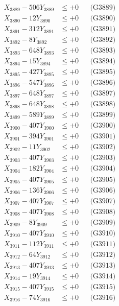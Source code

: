 \documentclass[a4paper,10pt]{article}
\begin{document}
{\begin{align}
X_{3889} - 506Y_{3889} &\leq +0 && \text{(G3889)} \\
X_{3890} - 12Y_{3890} &\leq +0 && \text{(G3890)} \\
\allowbreak
X_{3891} - 312Y_{3891} &\leq +0 && \text{(G3891)} \\
X_{3892} - 8Y_{3892} &\leq +0 && \text{(G3892)} \\
X_{3893} - 648Y_{3893} &\leq +0 && \text{(G3893)} \\
X_{3894} - 15Y_{3894} &\leq +0 && \text{(G3894)} \\
X_{3895} - 427Y_{3895} &\leq +0 && \text{(G3895)} \\
X_{3896} - 547Y_{3896} &\leq +0 && \text{(G3896)} \\
X_{3897} - 648Y_{3897} &\leq +0 && \text{(G3897)} \\
X_{3898} - 648Y_{3898} &\leq +0 && \text{(G3898)} \\
X_{3899} - 589Y_{3899} &\leq +0 && \text{(G3899)} \\
X_{3900} - 407Y_{3900} &\leq +0 && \text{(G3900)} \\
\allowbreak
X_{3901} - 394Y_{3901} &\leq +0 && \text{(G3901)} \\
X_{3902} - 11Y_{3902} &\leq +0 && \text{(G3902)} \\
X_{3903} - 407Y_{3903} &\leq +0 && \text{(G3903)} \\
X_{3904} - 182Y_{3904} &\leq +0 && \text{(G3904)} \\
X_{3905} - 407Y_{3905} &\leq +0 && \text{(G3905)} \\
X_{3906} - 136Y_{3906} &\leq +0 && \text{(G3906)} \\
X_{3907} - 407Y_{3907} &\leq +0 && \text{(G3907)} \\
X_{3908} - 407Y_{3908} &\leq +0 && \text{(G3908)} \\
X_{3909} - 8Y_{3909} &\leq +0 && \text{(G3909)} \\
X_{3910} - 407Y_{3910} &\leq +0 && \text{(G3910)} \\
\allowbreak
X_{3911} - 112Y_{3911} &\leq +0 && \text{(G3911)} \\
X_{3912} - 64Y_{3912} &\leq +0 && \text{(G3912)} \\
X_{3913} - 407Y_{3913} &\leq +0 && \text{(G3913)} \\
X_{3914} - 19Y_{3914} &\leq +0 && \text{(G3914)} \\
X_{3915} - 407Y_{3915} &\leq +0 && \text{(G3915)} \\
X_{3916} - 74Y_{3916} &\leq +0 && \text{(G3916)} \\

\end{align}}
\end{document}
